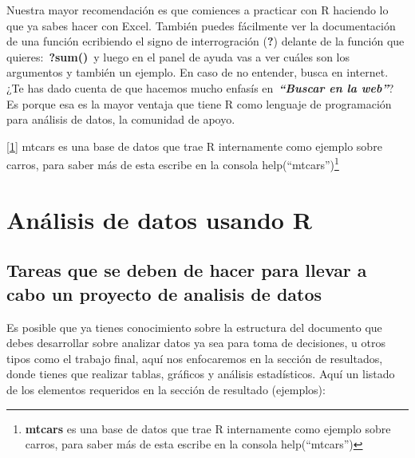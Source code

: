 \documentclass[
  letterpaper,
  DIV=11,
  numbers=noendperiod]{scrreprt}
\begin{document}
Nuestra mayor recomendación es que comiences a practicar con R haciendo
lo que ya sabes hacer con Excel. También puedes fácilmente ver la
documentación de una función ecribiendo el signo de interrogración
(\textbf{?}) delante de la función que quieres:~\textbf{?sum()}~y luego
en el panel de ayuda vas a ver cuáles son los argumentos y también un
ejemplo. En caso de no entender, busca en internet. ¿Te has dado cuenta
de que hacemos mucho enfasís en~\textbf{\emph{``Buscar en la web''}}? Es
porque esa es la mayor ventaja que tiene R como lenguaje de programación
para análisis de datos, la comunidad de apoyo.

\hyperref[_ftnref1]{{[}1{]}} mtcars es una base de datos que trae R
internamente como ejemplo sobre carros, para saber más de esta escribe
en la consola help(``mtcars'')\footnote{\textbf{mtcars} es una base de
  datos que trae R internamente como ejemplo sobre carros, para saber
  más de esta escribe en la consola help(``mtcars'')}


\chapter{Análisis de datos usando
R}\label{anuxe1lisis-de-datos-usando-r}

\section{Tareas que se deben de hacer para llevar a cabo un proyecto de
analisis de
datos}\label{tareas-que-se-deben-de-hacer-para-llevar-a-cabo-un-proyecto-de-analisis-de-datos}

Es posible que ya tienes conocimiento sobre la estructura del documento
que debes desarrollar sobre analizar datos ya sea para toma de
decisiones, u otros tipos como el trabajo final, aquí nos enfocaremos en
la sección de resultados, donde tienes que realizar tablas, gráficos y
análisis estadísticos. Aquí un listado de los elementos requeridos en la
sección de resultado (ejemplos):
\end{document}
